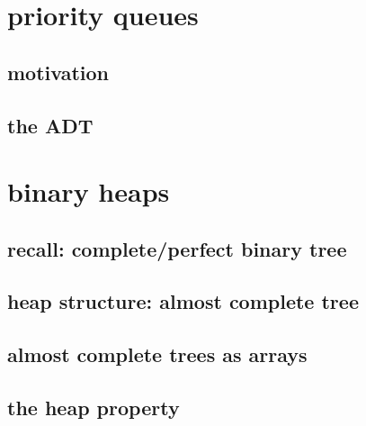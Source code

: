 
\begin{frame}
    \titlepage
\end{frame}

%

\section{priority queues}

\subsection{motivation}



\subsection{the ADT}



\section{binary heaps}



\subsection{recall: complete/perfect binary tree}



\subsection{heap structure: almost complete tree}



\subsection{almost complete trees as arrays}



\subsection{the heap property}



